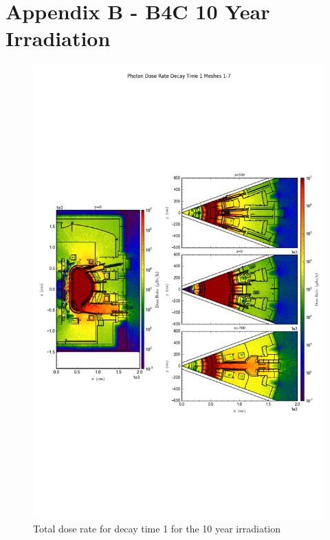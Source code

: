 \documentclass[12pt]{article}
\begin{document}
\section{Appendix B - B4C 10 Year Irradiation}
\begin{figure}[ht!]
\centering
\includegraphics[trim={0cm 8cm, 0cm 8cm},clip,scale=0.75]{../plots/final_model_with_b4c/10year/Photon_Dose_Rate_Decay_Time_1_Meshes_1-7.png}
\caption{Total dose rate for decay time 1 for the 10 year irradiation}
\label{fig:photons_10y_dc1_b4c_dose}
\end{figure}
\end{document}
